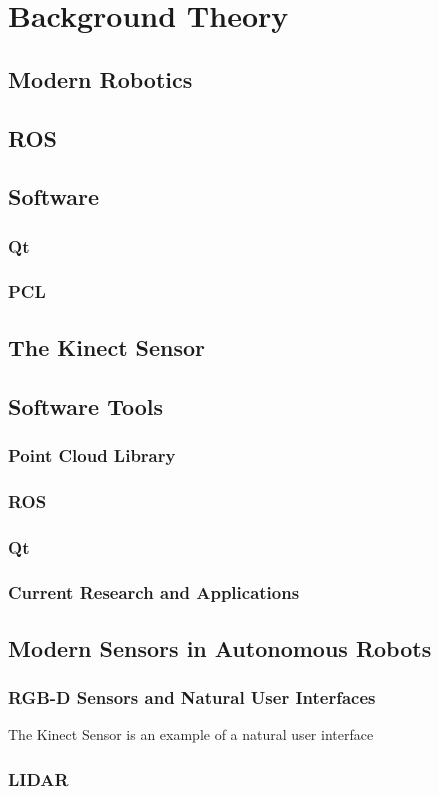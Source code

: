 \chapter{Background Theory}
\label{chp:theory} 


\section{Modern Robotics}

\section{ROS}

\section{Software}

\subsection{Qt}

\subsection{PCL}

\section{The Kinect Sensor}

\section{Software Tools}

\subsection{Point Cloud Library}

\subsection{ROS}

\subsection{Qt}


\subsection{Current Research and Applications}

\section{Modern Sensors in Autonomous Robots}

\subsection{RGB-D Sensors and Natural User Interfaces}

The Kinect Sensor is an example of a natural user interface

\subsection{LIDAR}



